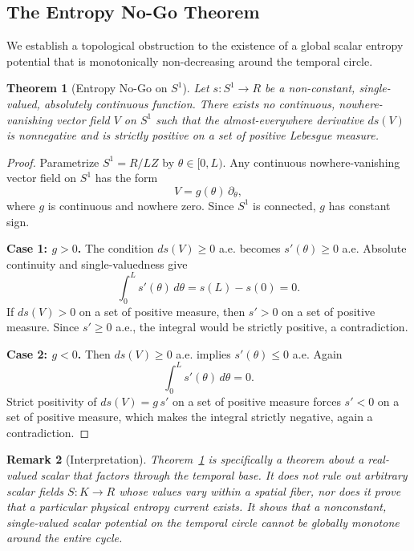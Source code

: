 \documentclass[11pt]{article}
\theoremstyle{canonmath}
\newtheorem{theorem}{Theorem}[section]
\newtheorem{remark}[theorem]{Remark}
\theoremstyle{canonpostulate}
\theoremstyle{canonproposition}
\providecommand{\Klein}{\mathcal{K}}
\providecommand{\R}{\mathbb{R}}
\providecommand{\Z}{\mathbb{Z}}
\providecommand{\Sone}{S^1}
\def\mathbb#1{#1}%
\def\mathcal#1{#1}%
\begin{document}
\subsection{The Entropy No-Go Theorem}

We establish a topological obstruction to the existence of a global scalar entropy potential that is monotonically non-decreasing around the temporal circle.

\begin{theorem}[Entropy No-Go on $\Sone$] \label{thm:entropy_nogo}
Let $s:\Sone\to\R$ be a non-constant, single-valued, absolutely continuous function. There exists no continuous, nowhere-vanishing vector field $V$ on $\Sone$ such that the almost-everywhere derivative $ds(V)$ is nonnegative and is strictly positive on a set of positive Lebesgue measure.
\end{theorem}
\begin{proof}
Parametrize $\Sone=\R/L\Z$ by $\theta\in[0,L)$. Any continuous nowhere-vanishing vector field on $\Sone$ has the form
\[
V=g(\theta)\,\partial_\theta,
\]
where $g$ is continuous and nowhere zero. Since $\Sone$ is connected, $g$ has constant sign.

\textbf{Case 1: $g>0$.} The condition $ds(V)\ge0$ a.e. becomes $s'(\theta)\ge0$ a.e. Absolute continuity and single-valuedness give
\[
\int_0^L s'(\theta)\,d\theta=s(L)-s(0)=0.
\]
If $ds(V)>0$ on a set of positive measure, then $s'>0$ on a set of positive measure. Since $s'\ge0$ a.e., the integral would be strictly positive, a contradiction.

\textbf{Case 2: $g<0$.} Then $ds(V)\ge0$ a.e. implies $s'(\theta)\le0$ a.e. Again
\[
\int_0^L s'(\theta)\,d\theta=0.
\]
Strict positivity of $ds(V)=g\,s'$ on a set of positive measure forces $s'<0$ on a set of positive measure, which makes the integral strictly negative, again a contradiction.
\end{proof}

\begin{remark}[Interpretation]
Theorem~\ref{thm:entropy_nogo} is specifically a theorem about a real-valued scalar that factors through the temporal base. It does not rule out arbitrary scalar fields $S:\Klein\to\R$ whose values vary within a spatial fiber, nor does it prove that a particular physical entropy current exists. It shows that a nonconstant, single-valued scalar potential on the temporal circle cannot be globally monotone around the entire cycle.
\end{remark}
\end{document}
